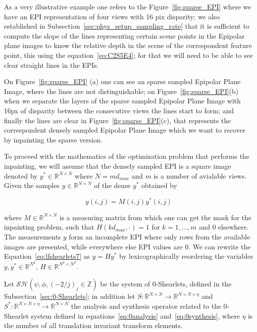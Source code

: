 \bigskip


As a very illustrative example one refers to the Figure~\ref{fig:sparse_EPI} where we have an EPI representation of four views with 16 pix disparity; we also established in Subsection~\ref{sec:phys_setup_sampling_rate} that it is sufficient to compute the slope of the lines representing certain scene points in the Epipolar plane images to know the relative depth in the scene of the correspondent feature point, this using the equation~\ref{eq:C2S5E4}; for that we will need to be able to see clear straight lines in the EPIs.

\bigskip

On Figure~\ref{fig:sparse_EPI} (a) one can see an sparse sampled Epipolar Plane Image, where the lines are not distinguishable; on Figure~\ref{fig:sparse_EPI}(b) when we separate the layers of the sparse sampled Epipolar Plane Image with 16px of disparity between the consecutive views the lines start to form; and finally the lines are clear in Figure~\ref{fig:sparse_EPI}(c), that represents the correspondent densely sampled Epipolar Plane Image which we want to recover by inpainting the sparse version. 

\bigskip

To proceed with the mathematics of the optimization problem that performs the inpainting, we will assume that the densely sampled EPI is a square image denoted by $y^*\in \mathbb{R}^{N\times N}$ where $N=md_{max}$ and $m$ is a number of avialable views. Given the samples $y\in\mathbb{R}^{N\times N}$ of the dense $y^*$ obtained by 

\begin{equation}
\label{eq:lfshearlets7}
y(i,j)=M(i,j)y^*(i,j)
\end{equation}

where $M\in\mathbb{R}^{N\times N}$ is a measuring matrix from which one can get the mask for the inpainting problem, such that $H(kd_{max},\cdot)=1$ for $k=1,\ldots,m$ and $0$ elsewhere. The measurements $y$ form an incomplete EPI where only rows from the available images are presented, while everywhere else EPI values are $0$. We can rewrite the Equation~\ref{eq:lfshearlets7} as $y=Hy^*$ by lexicographically reordering the variables $y,y^*\in \mathbb{R}^{N^2}$, $H\in\mathbb{R}^{N^2\times N^2}$. 

\bigskip 

Let $\mathcal{SH}(\psi,\phi,(-2/j)_j\in\mathbb{Z})$ be the system of $0$-Shearlets, defined in the Subsection~\ref{sec:0-Shearlets}; in addition let $S:\mathbb{R}^{N\times N}\longrightarrow \mathbb{R}^{N\times N\times\eta}$ and $S^*: \mathbb{R}^{N\times N\times\eta}\longrightarrow \mathbb{R}^{N\times N}$ the analysis and synthesis operator related to the $0$-Shearlet system defined in equations~\ref{eq:0analysis} and~\ref{eq:0synthesis}, where $\eta$ is the number of all translation invariant transform elements.

